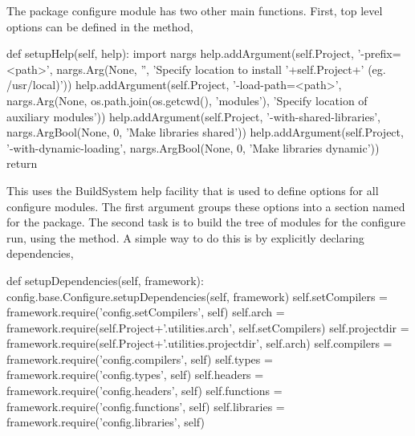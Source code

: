 {{{The package configure module has two other main functions. First, top level options can be defined in the  method,
\begin{pythonlisting}
def setupHelp(self, help):
  import nargs
  help.addArgument(self.Project, '-prefix=<path>', nargs.Arg(None, '', 'Specify location to install '+self.Project+' (eg. /usr/local)'))
  help.addArgument(self.Project, '-load-path=<path>', nargs.Arg(None, os.path.join(os.getcwd(), 'modules'), 'Specify location of auxiliary modules'))
  help.addArgument(self.Project, '-with-shared-libraries', nargs.ArgBool(None, 0, 'Make libraries shared'))
  help.addArgument(self.Project, '-with-dynamic-loading', nargs.ArgBool(None, 0, 'Make libraries dynamic'))
  return
\end{pythonlisting}
This uses the BuildSystem help facility that is used to define options for all configure modules. The first argument groups these options into a section named for the package. The second task is to build the tree of modules for the configure run, using the  method. A simple way to do this is by explicitly declaring dependencies,
\begin{pythonlisting}
def setupDependencies(self, framework):
    config.base.Configure.setupDependencies(self, framework)
    self.setCompilers  = framework.require('config.setCompilers',                self)
    self.arch          = framework.require(self.Project+'.utilities.arch',       self.setCompilers)
    self.projectdir    = framework.require(self.Project+'.utilities.projectdir', self.arch)
    self.compilers     = framework.require('config.compilers',                   self)
    self.types         = framework.require('config.types',                       self)
    self.headers       = framework.require('config.headers',                     self)
    self.functions     = framework.require('config.functions',                   self)
    self.libraries     = framework.require('config.libraries',                   self)


\end{pythonlisting}}}}
